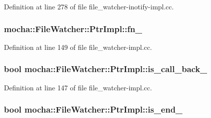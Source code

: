 Definition at line 278 of file file\_\-watcher-\/inotify-\/impl.cc.

\hypertarget{classmocha_1_1_file_watcher_1_1_ptr_impl_aad15f2df19b37f02b4e688f057cb993a}{
\subsubsection[{fn\_\-}]{ {\bf mocha::FileWatcher::PtrImpl::fn\_\-}}}
\label{classmocha_1_1_file_watcher_1_1_ptr_impl_aad15f2df19b37f02b4e688f057cb993a}


Definition at line 149 of file file\_\-watcher-\/impl.cc.

\hypertarget{classmocha_1_1_file_watcher_1_1_ptr_impl_af9894b6a727c08a00d378d74657d33d4}{
\subsubsection[{is\_\-call\_\-back\_\-}]{\setlength{\rightskip}{0pt plus 5cm}bool {\bf mocha::FileWatcher::PtrImpl::is\_\-call\_\-back\_\-}}}
\label{classmocha_1_1_file_watcher_1_1_ptr_impl_af9894b6a727c08a00d378d74657d33d4}


Definition at line 147 of file file\_\-watcher-\/impl.cc.

\hypertarget{classmocha_1_1_file_watcher_1_1_ptr_impl_ac2596e9026a0319cf7300584746be3aa}{
\subsubsection[{is\_\-end\_\-}]{\setlength{\rightskip}{0pt plus 5cm}bool {\bf mocha::FileWatcher::PtrImpl::is\_\-end\_\-}}}
\label{classmocha_1_1_file_watcher_1_1_ptr_impl_ac2596e9026a0319cf7300584746be3aa}


